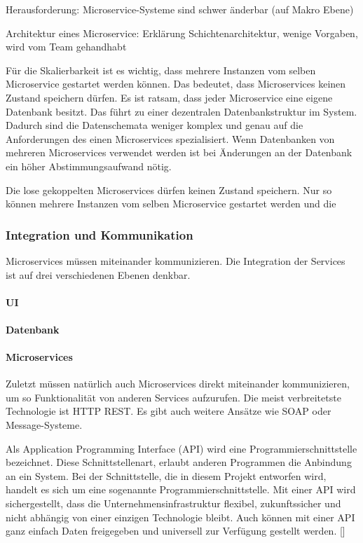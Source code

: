 Herausforderung: Microservice-Systeme sind schwer änderbar (auf Makro Ebene)

Architektur eines Microservice: Erklärung Schichtenarchitektur, wenige Vorgaben, wird vom Team gehandhabt

Für die Skalierbarkeit ist es wichtig, dass mehrere Instanzen vom selben Microservice gestartet werden können. Das bedeutet, dass Microservices keinen Zustand speichern dürfen.
Es ist ratsam, dass jeder Microservice eine eigene Datenbank besitzt. Das führt zu einer dezentralen Datenbankstruktur im System. Dadurch sind die Datenschemata weniger komplex und genau auf die Anforderungen des einen Microservices spezialisiert.  Wenn Datenbanken von mehreren Microservices verwendet werden ist bei Änderungen an der Datenbank ein höher Abstimmungsaufwand nötig.

Die lose gekoppelten Microservices dürfen keinen Zustand speichern. Nur so können mehrere Instanzen vom selben Microservice gestartet werden und die 

\subsubsection{Integration und Kommunikation}

Microservices müssen miteinander kommunizieren. Die Integration der Services ist auf drei verschiedenen Ebenen denkbar.

\paragraph{UI}

\paragraph{Datenbank}

\paragraph{Microservices}

Zuletzt müssen natürlich auch Microservices direkt miteinander kommunizieren, um so Funktionalität von anderen Services aufzurufen. Die meist verbreitetste Technologie ist HTTP REST. Es gibt auch weitere Ansätze wie SOAP oder Message-Systeme.

Als Application Programming Interface (API) wird eine Programmierschnittstelle bezeichnet. Diese Schnittstellenart, erlaubt anderen Programmen die Anbindung an ein System. Bei der Schnittstelle, die in diesem Projekt entworfen wird, handelt es sich um eine sogenannte Programmierschnittstelle. Mit einer API wird sichergestellt, dass die Unternehmensinfrastruktur flexibel, zukunftssicher und nicht abhängig von einer einzigen Technologie bleibt. Auch können mit einer API ganz einfach Daten freigegeben und universell zur Verfügung gestellt werden. [\cite[S. 95ff]{koflerDigitale2018}]

